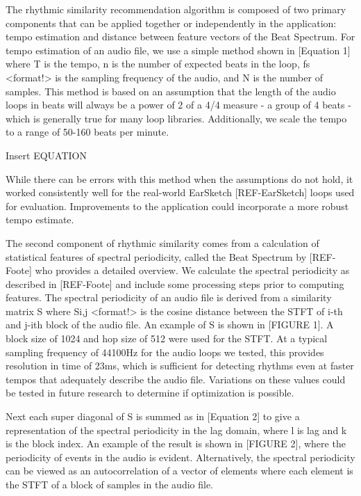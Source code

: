 \documentclass{article}
\begin{document}
The rhythmic similarity recommendation algorithm is composed of two primary components that can be applied together or independently in the application: tempo estimation and distance between feature vectors of the Beat Spectrum. For tempo estimation of an audio file, we use a simple method shown in [Equation 1] where T is the tempo, n is the number of expected beats in the loop, fs <format!> is the sampling frequency of the audio, and N is the number of samples. This method is based on an assumption that the length of the audio loops in beats will always be a power of 2 of a 4/4 measure - a group of 4 beats - which is generally true for many loop libraries. Additionally, we scale the tempo to a range of 50-160 beats per minute.

Insert EQUATION

While there can be errors with this method when the assumptions do not hold, it worked consistently well for the real-world EarSketch [REF-EarSketch] loops used for evaluation. Improvements to the application could incorporate a more robust tempo estimate.

The second component of rhythmic similarity comes from a calculation of statistical features of spectral periodicity, called the Beat Spectrum by [REF-Foote] who provides a detailed overview. We calculate the spectral periodicity as described in [REF-Foote] and include some processing steps prior to computing features. The spectral periodicity of an audio file is derived from a similarity matrix S where Si,j <format!> is the cosine distance between the STFT of i-th and j-ith block of the audio file. An example of S is shown in [FIGURE 1]. A block size of 1024 and hop size of 512 were used for the STFT. At a typical sampling frequency of 44100Hz for the audio loops we tested, this provides resolution in time of 23ms, which is sufficient for detecting rhythms even at faster tempos that adequately describe the audio file. Variations on these values could be tested in future research to determine if optimization is possible.

Next each super diagonal of S is summed as in [Equation 2] to give a representation of the spectral periodicity in the lag domain, where l is lag and k is the block index. An example of the result is shown in [FIGURE 2], where the periodicity of events in the audio is evident. Alternatively, the spectral periodicity can be viewed as an autocorrelation of a vector of elements where each element is the STFT of a block of samples in the audio file.
\end{document}
